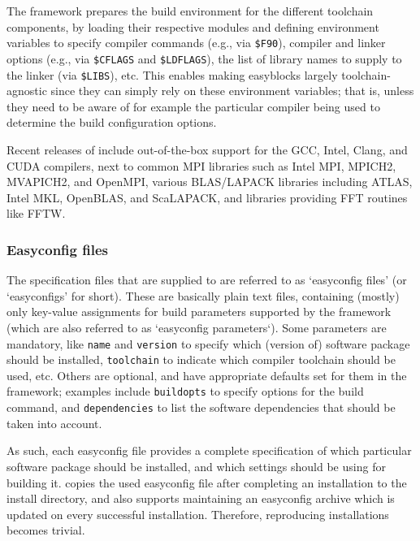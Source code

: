 The \easybuild{} framework prepares the build environment for the different
toolchain components, by loading their respective modules and defining environment
variables to specify compiler commands (e.g., via \texttt{\$F90}), compiler and
linker options (e.g., via \texttt{\$CFLAGS} and \texttt{\$LDFLAGS}), the list of
library names to supply to the linker (via \texttt{\$LIBS}), etc. This enables
making easyblocks largely toolchain-agnostic since they can simply rely on these
environment variables; that is, unless they need to be aware of for example the
particular compiler being used to determine the build configuration options.

Recent releases of \easybuild{} include out-of-the-box support for the GCC, Intel,
Clang, and CUDA compilers, next to common MPI libraries such as Intel MPI, MPICH2,
MVAPICH2, and OpenMPI, various BLAS/LAPACK libraries including ATLAS, Intel MKL,
OpenBLAS, and ScaLAPACK, and libraries providing FFT routines like FFTW.

\subsubsection{Easyconfig files}
\label{sec:eb_easyconfigs}

The specification files that are supplied to \easybuild{} are referred to as
`easyconfig files' (or `easyconfigs' for short). These are basically plain text
files, containing (mostly) only key-value assignments for build parameters supported
by the framework (which are also referred to as `easyconfig parameters`). Some
parameters are mandatory, like \texttt{name} and \texttt{version} to specify which
(version of) software package should be installed, \texttt{toolchain} to indicate
which compiler toolchain should be used, etc. Others are optional, and have
appropriate defaults set for them in the \easybuild{} framework; examples include
\texttt{buildopts} to specify options for the build command, and \texttt{dependencies}
to list the software dependencies that should be taken into account.

As such, each easyconfig file provides a complete specification of which particular
software package should be installed, and which settings should be using for building
it. \easybuild{} copies the used easyconfig file after completing an installation
to the install directory, and also supports maintaining an easyconfig archive which
is updated on every successful installation. Therefore, reproducing installations
becomes trivial.

